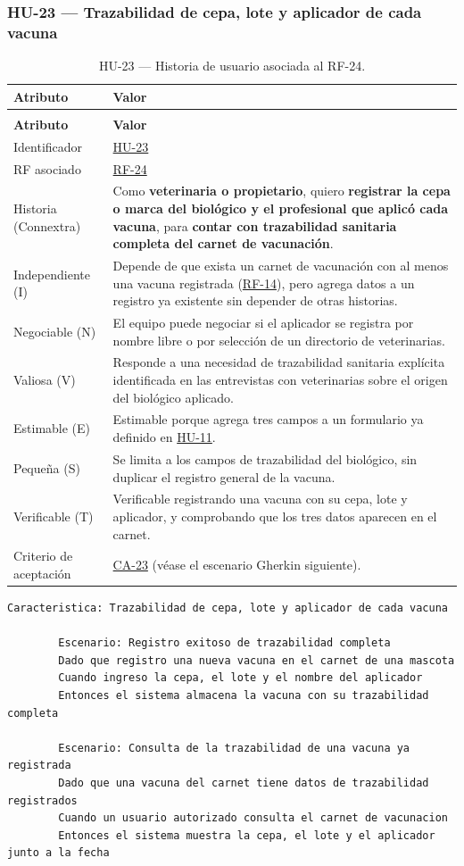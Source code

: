 \documentclass[journal,onecolumn]{IEEEtran}
\makeatletter
\newenvironment{atributos}[2]{%
	\small
	\begin{longtable}{@{}>{\raggedright\arraybackslash}p{4.2cm} >{\raggedright\arraybackslash}p{11.2cm}@{}}
		\caption{#2}\label{tab:#1}\\
		\toprule
		\textbf{Atributo} & \textbf{Valor} \\
		\midrule
		\endfirsthead
		\multicolumn{2}{@{}l}{\small\itshape (continuación)}\\
		\toprule
		\textbf{Atributo} & \textbf{Valor} \\
		\midrule
		\endhead
		\bottomrule
		\endlastfoot
	}{%
	\end{longtable}
	\normalsize
}
\makeatother
\begin{document}
	\subsubsection{HU-23 --- Trazabilidad de cepa, lote y aplicador de cada vacuna}
	
	\begin{atributos}{HU-23}{HU-23 --- Historia de usuario asociada al RF-24.}
		Identificador & \hyperref[tab:HU-23]{HU-23} \\
		RF asociado & \hyperref[tab:RF-24]{RF-24} \\
		Historia (Connextra) & Como \textbf{veterinaria o propietario}, quiero \textbf{registrar la cepa o marca del biológico y el profesional que aplicó cada vacuna}, para \textbf{contar con trazabilidad sanitaria completa del carnet de vacunación}. \\
		Independiente (I) & Depende de que exista un carnet de vacunación con al menos una vacuna registrada (\hyperref[tab:RF-14]{RF-14}), pero agrega datos a un registro ya existente sin depender de otras historias. \\
		Negociable (N) & El equipo puede negociar si el aplicador se registra por nombre libre o por selección de un directorio de veterinarias. \\
		Valiosa (V) & Responde a una necesidad de trazabilidad sanitaria explícita identificada en las entrevistas con veterinarias sobre el origen del biológico aplicado. \\
		Estimable (E) & Estimable porque agrega tres campos a un formulario ya definido en \hyperref[tab:HU-11]{HU-11}. \\
		Pequeña (S) & Se limita a los campos de trazabilidad del biológico, sin duplicar el registro general de la vacuna. \\
		Verificable (T) & Verificable registrando una vacuna con su cepa, lote y aplicador, y comprobando que los tres datos aparecen en el carnet. \\
		Criterio de aceptación & \hyperref[lst:ca23]{CA-23} (véase el escenario Gherkin siguiente). \\
	\end{atributos}
	
	\begin{lstlisting}[style=gherkin,caption={CA-23 --- Escenario de aceptación de la historia HU-23.},label={lst:ca23}]
		Caracteristica: Trazabilidad de cepa, lote y aplicador de cada vacuna
		
		Escenario: Registro exitoso de trazabilidad completa
		Dado que registro una nueva vacuna en el carnet de una mascota
		Cuando ingreso la cepa, el lote y el nombre del aplicador
		Entonces el sistema almacena la vacuna con su trazabilidad completa
		
		Escenario: Consulta de la trazabilidad de una vacuna ya registrada
		Dado que una vacuna del carnet tiene datos de trazabilidad registrados
		Cuando un usuario autorizado consulta el carnet de vacunacion
		Entonces el sistema muestra la cepa, el lote y el aplicador junto a la fecha
	\end{lstlisting}
	
\end{document}
